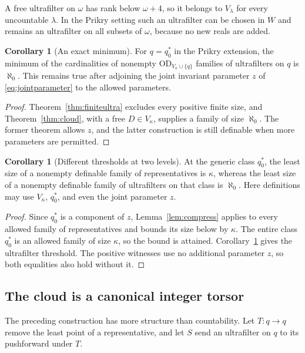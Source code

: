 \documentclass[11pt,letterpaper]{article}
\theoremstyle{definition}
\newtheorem{corollary}[definition]{Corollary}
\numberwithin{equation}{section}
\newcommand{\OD}{\mathrm{OD}}
\begin{document}
A free ultrafilter on $\omega$ has rank below $\omega+4$, so it belongs to $V_\lambda$ for every uncountable $\lambda$. In the Prikry setting such an ultrafilter can be chosen in $W$ and remains an ultrafilter on all subsets of $\omega$, because no new reals are added.

\begin{corollary}[An exact minimum]\label{cor:minultra}
For $q=q_0^*$ in the Prikry extension, the minimum of the cardinalities of nonempty $\OD_{V_\kappa\cup\{q\}}$ families of ultrafilters on $q$ is $\aleph_0$. This remains true after adjoining the joint invariant parameter $z$ of \eqref{eq:jointparameter} to the allowed parameters.
\end{corollary}
\begin{proof}
Theorem~\ref{thm:finiteultra} excludes every positive finite size, and Theorem~\ref{thm:cloud}, with a free $D\in V_\kappa$, supplies a family of size $\aleph_0$. The former theorem allows $z$, and the latter construction is still definable when more parameters are permitted.
\end{proof}

\begin{corollary}[Different thresholds at two levels]\label{cor:twolevels}
At the generic class $q_0^*$, the least size of a nonempty definable family of representatives is $\kappa$, whereas the least size of a nonempty definable family of ultrafilters on that class is $\aleph_0$. Here definitions may use $V_\kappa$, $q_0^*$, and even the joint parameter $z$.
\end{corollary}
\begin{proof}
Since $q_0^*$ is a component of $z$, Lemma~\ref{lem:compress} applies to every allowed family of representatives and bounds its size below by $\kappa$. The entire class $q_0^*$ is an allowed family of size $\kappa$, so the bound is attained. Corollary~\ref{cor:minultra} gives the ultrafilter threshold. The positive witnesses use no additional parameter $z$, so both equalities also hold without it.
\end{proof}

\subsection{The cloud is a canonical integer torsor}

The preceding construction has more structure than countability. Let $T:q\to q$ remove the least point of a representative, and let $S$ send an ultrafilter on $q$ to its pushforward under $T$.
\end{document}

